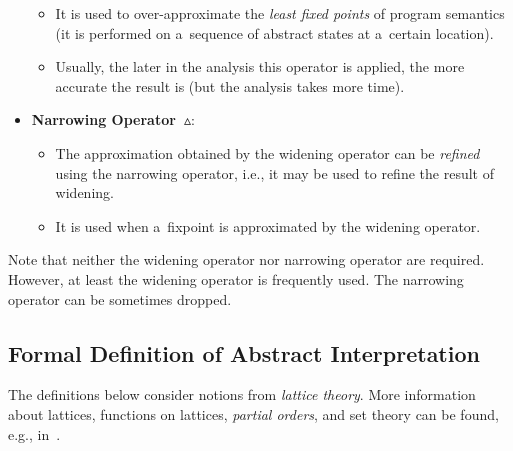 \begin{itemize}
\begin{itemize}
            \item It is used to over-approximate the \emph{least fixed points} of program semantics (it is performed on a~sequence of abstract states at a~certain location).

            \item Usually, the later in the analysis this operator is applied, the more accurate the result is (but the analysis takes more time).
        \end{itemize}

    \item \textbf{Narrowing Operator~$ \boldsymbol{\vartriangle} $}:
        \begin{itemize}
            \item The approximation obtained by the widening operator can be \emph{refined} using the narrowing operator, i.e., it may be used to refine the result of widening.

            \item It is used when a~fixpoint is approximated by the widening operator.
        \end{itemize}
\end{itemize}
Note that neither the widening operator nor narrowing operator are required. However, at least the widening operator is frequently used. The narrowing operator can be sometimes dropped.

\subsection{Formal Definition of Abstract Interpretation}

The definitions below consider notions from \emph{lattice theory}. More information about lattices, functions on lattices, \emph{partial orders}, and set theory can be found, e.g., in~\cite{staticAnalysisMoller, programAnalysisNielson, staticAnalysisRival}.

